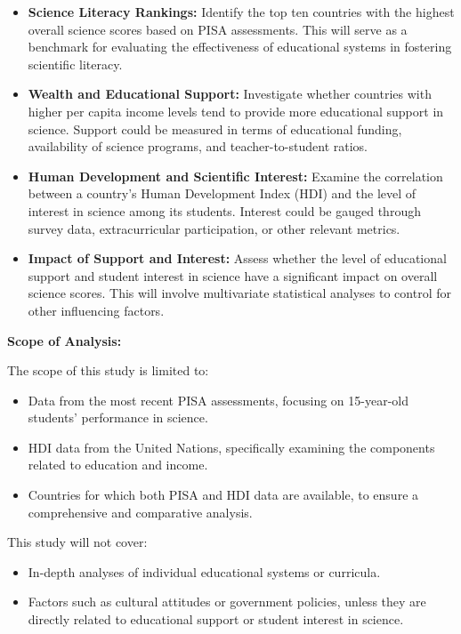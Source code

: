 \documentclass[12pt]{article}
\begin{document}
\begin{itemize}
\item \textbf{Science Literacy Rankings:} Identify the top ten countries with the highest overall science scores based on PISA assessments. This will serve as a benchmark for evaluating the effectiveness of educational systems in fostering scientific literacy.

\item \textbf{Wealth and Educational Support:} Investigate whether countries with higher per capita income levels tend to provide more educational support in science. Support could be measured in terms of educational funding, availability of science programs, and teacher-to-student ratios.

\item \textbf{Human Development and Scientific Interest:} Examine the correlation between a country's Human Development Index (HDI) and the level of interest in science among its students. Interest could be gauged through survey data, extracurricular participation, or other relevant metrics.

\item \textbf{Impact of Support and Interest:} Assess whether the level of educational support and student interest in science have a significant impact on overall science scores. This will involve multivariate statistical analyses to control for other influencing factors.
\end{itemize}

\textbf{Scope of Analysis:}

The scope of this study is limited to:

\begin{itemize}
\item Data from the most recent PISA assessments, focusing on 15-year-old students' performance in science.

\item HDI data from the United Nations, specifically examining the components related to education and income.

\item Countries for which both PISA and HDI data are available, to ensure a comprehensive and comparative analysis.
\end{itemize}

This study will not cover:

\begin{itemize}
\item In-depth analyses of individual educational systems or curricula.

\item Factors such as cultural attitudes or government policies, unless they are directly related to educational support or student interest in science.
\end{itemize}
\end{document}
